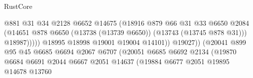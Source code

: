 \begin{lexlean}{RustCore}
\begin{coremodule}
                                                    @881
                                                    @31
                                                    @34
                                                    @2128
                                                    @6652
                                                    @14675
                                                    (@18916
                                                      @879
                                                      @66
                                                      @31
                                                      @33
                                                      @6650
                                                      @2084
                                                      (@14651
                                                        @878
                                                        @6650
                                                        (@13738 (@13739 @6650))
                                                        (@13743 (@13745 @878 @31)))
                                                      @18987)))))
                                            @18995
                                            @18998
                                            @19001
                                            @19004
                                            @14101))
                                        @19027))
                                    (@20041
                                      @899
                                      @95
                                      @45
                                      @6685
                                      @6694
                                      @2067
                                      @6707
                                      (@20051
                                        @6685
                                        @6692
                                        @2134
                                        (@19870
                                          @6684
                                          @6691
                                          @2044
                                          @6667
                                          @2051
                                          @14637
                                          (@19884
                                            @6677
                                            @2051
                                            @19895
                                            @14678
                                            @13760

\end{coremodule}
\end{lexlean}
